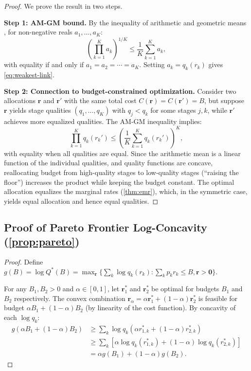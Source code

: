 \documentclass[11pt, a4paper, copyright]{googledeepmind}
\begin{document}
\begin{appendices}
\begin{proof}
We prove the result in two steps.

\textbf{Step 1: AM-GM bound.} By the inequality of arithmetic and geometric means \citep{hardy1952}, for non-negative reals $a_1, \ldots, a_K$:
\[
    \left(\prod_{k=1}^K a_k\right)^{1/K} \leq \frac{1}{K}\sum_{k=1}^K a_k,
\]
with equality if and only if $a_1 = a_2 = \cdots = a_K$. Setting $a_k = q_k(r_k)$ gives \cref{eq:weakest-link}.

\textbf{Step 2: Connection to budget-constrained optimization.} Consider two allocations $\mathbf{r}$ and $\mathbf{r}'$ with the same total cost $C(\mathbf{r}) = C(\mathbf{r}') = B$, but suppose $\mathbf{r}$ yields stage qualities $(q_1, \ldots, q_K)$ with $q_j < q_k$ for some stages $j, k$, while $\mathbf{r}'$ achieves more equalized qualities. The AM-GM inequality implies:
\[
    \prod_{k=1}^K q_k(r_k') \leq \left(\frac{1}{K}\sum_{k=1}^K q_k(r_k')\right)^K,
\]
with equality when all qualities are equal. Since the arithmetic mean is a linear function of the individual qualities, and quality functions are concave, reallocating budget from high-quality stages to low-quality stages (``raising the floor'') increases the product while keeping the budget constant. The optimal allocation equalizes the marginal rates (\cref{thm:emr}), which, in the symmetric case, yields equal allocation and hence equal qualities.
\end{proof}

\subsection{Proof of Pareto Frontier Log-Concavity (\texorpdfstring{\cref{prop:pareto}}{Proposition 3.8})}

\begin{proof}
Define $g(B) = \log Q^*(B) = \max_{\mathbf{r}} \{\sum_k \log q_k(r_k) : \sum_k p_k r_k \leq B, \mathbf{r} > \mathbf{0}\}$.

For any $B_1, B_2 > 0$ and $\alpha \in [0,1]$, let $\mathbf{r}_1^*$ and $\mathbf{r}_2^*$ be optimal for budgets $B_1$ and $B_2$ respectively. The convex combination $\mathbf{r}_\alpha = \alpha \mathbf{r}_1^* + (1-\alpha)\mathbf{r}_2^*$ is feasible for budget $\alpha B_1 + (1-\alpha)B_2$ (by linearity of the cost function). By concavity of each $\log q_k$:
\begin{align*}
    g(\alpha B_1 + (1-\alpha)B_2) &\geq \sum_k \log q_k(\alpha r_{1,k}^* + (1-\alpha)r_{2,k}^*) \\
    &\geq \sum_k \left[\alpha \log q_k(r_{1,k}^*) + (1-\alpha)\log q_k(r_{2,k}^*)\right] \\
    &= \alpha g(B_1) + (1-\alpha) g(B_2).
\end{align*}


\end{proof}
\end{appendices}
\end{document}
